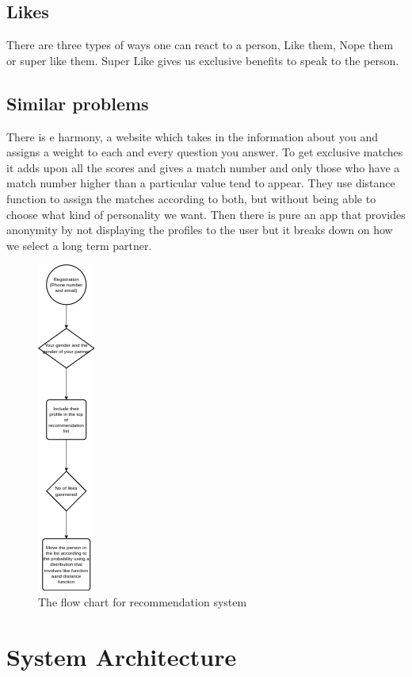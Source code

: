\documentclass[conference]{IEEEtran}
\begin{document}
\subsection{Likes}
There are three types of ways one can react to a person, Like them, Nope them or super like them. Super Like gives us exclusive benefits to speak to the person.

\subsection{Similar problems}
There is e harmony, a website which takes in the information about you and assigns a weight to each and every question you answer. To get exclusive matches it adds upon all the scores and gives a match number and only those who have a match number higher than a particular value tend to appear. They use distance function to assign the matches according to both, but without being able to choose what kind of personality we want. Then there is pure an app that provides anonymity by not displaying the profiles to the user but it breaks down on how we select a long term partner. 

\begin{figure}[htbp]
\centerline{\includegraphics{dass_1.drawio.png}}
\caption{The flow chart for recommendation system}
\label{fig}
\end{figure}

\section{System Architecture}
\end{document}
